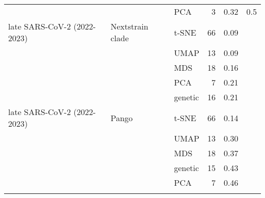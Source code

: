 \begin{tabular}{lllrrl}
                                        &                    &     PCA &               3 &                           0.32 &       0.5 \\
            late SARS-CoV-2 (2022-2023) &   Nextstrain clade &   t-SNE &              66 &                           0.09 &           \\
                                        &                    &    UMAP &              13 &                           0.09 &           \\
                                        &                    &     MDS &              18 &                           0.16 &           \\
                                        &                    &     PCA &               7 &                           0.21 &           \\
                                        &                    & genetic &              16 &                           0.21 &           \\
            late SARS-CoV-2 (2022-2023) &              Pango &   t-SNE &              66 &                           0.14 &           \\
                                        &                    &    UMAP &              13 &                           0.30 &           \\
                                        &                    &     MDS &              18 &                           0.37 &           \\
                                        &                    & genetic &              15 &                           0.43 &           \\
                                        &                    &     PCA &               7 &                           0.46 &           \\
\botrule
\end{tabular}
